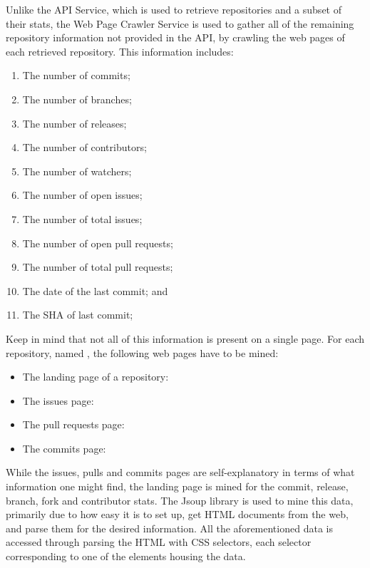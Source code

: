 Unlike the API Service, which is used to retrieve repositories and a subset of their stats, the Web Page Crawler Service is used to gather all of the remaining repository information not provided in the API, by crawling the web pages of each retrieved repository.
This information includes:
\begin{enumerate}
    \item The number of commits;
    \item The number of branches;
    \item The number of releases;
    \item The number of contributors;
    \item The number of watchers;
    \item The number of open issues;
    \item The number of total issues;
    \item The number of open pull requests;
    \item The number of total pull requests;
    \item The date of the last commit; and
    \item The SHA of last commit;
\end{enumerate}
Keep in mind that not all of this information is present on a single page.
For each repository, named , the following web pages have to be mined:
\begin{itemize}
    \item The landing page of a repository: 
    \item The issues page: 
    \item The pull requests page: 
    \item The commits page: 
\end{itemize}
While the issues, pulls and commits pages are self-explanatory in terms of what information one might find, the landing page is mined for the commit, release, branch, fork and contributor stats.
The Jsoup library is used to mine this data, primarily due to how easy it is to set up, get HTML documents from the web, and parse them for the desired information.
All the aforementioned data is accessed through parsing the HTML with CSS selectors, each selector corresponding to one of the elements housing the data.

